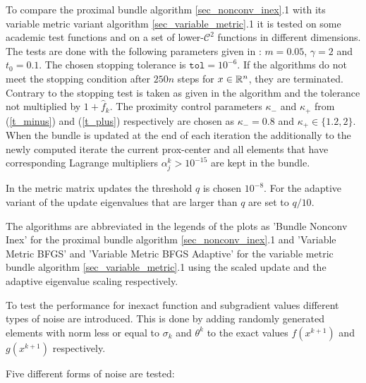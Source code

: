 To compare the proximal bundle algorithm \ref{sec_nonconv_inex}.1 with its variable metric variant algorithm  \ref{sec_variable_metric}.1 it is tested on some academic test functions and on a set of lower-\(\mathcal{C}^2\) functions in different dimensions.
The tests are done with the following parameters given in \cite{Hare2016}: \(m = 0.05\), \(\gamma = 2\) and \(t_0 = 0.1\). The chosen stopping tolerance is \(\mathtt{tol} = 10^{-6}\). If the algorithms do not meet the stopping condition after \(250n\) steps for \(x \in \mathbb{R}^n\), they are terminated. Contrary to \cite{Hare2016} the stopping test is taken as given in the algorithm and the tolerance not multiplied by \(1+\hat{f}_k\).
The proximity control parameters \(\kappa_-\) and \(\kappa_+\) from (\ref{t_minus}) and (\ref{t_plus}) respectively are chosen as \(\kappa_-= 0.8\) and \(\kappa_+\in\{1.2,2\}\).
When the bundle is updated at the end of each iteration the additionally to the newly computed iterate the current prox-center and all elements that have corresponding Lagrange multipliers \(\alpha_j^k > 10^{-15}\) are kept in the bundle.

In the metric matrix updates the threshold \(q\) is chosen \(10^{-8}\).
For the adaptive variant of the update eigenvalues that are larger than \(q\) are set to \(q/10\).

The algorithms are abbreviated in the legends of the plots as 'Bundle Nonconv Inex' for the proximal bundle algorithm \ref{sec_nonconv_inex}.1 and 'Variable Metric BFGS' and 'Variable Metric BFGS Adaptive' for the variable metric bundle algorithm \ref{sec_variable_metric}.1 using the scaled update and the adaptive eigenvalue scaling respectively.




To test the performance for inexact function and subgradient values different types of noise are introduced. This is done by adding randomly generated elements with norm less or equal to \(\sigma_k\) and \(\theta^k\) to the exact values \(f(x^{k+1})\) and \(g(x^{k+1})\) respectively.

Five different forms of noise are tested:


